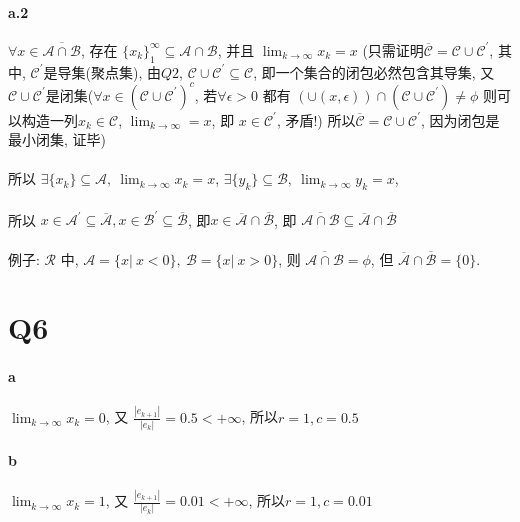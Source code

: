 \documentclass{article}
\begin{document}
\begin{CJK}{UTF8}{gbsn}
  \paragraph{a.2}
    $\forall x \in \overline{\mathcal{A} \cap \mathcal{B}}$, 存在 $\{x_k\}_1^{\infty} \subseteq \mathcal{A} \cap \mathcal{B}$, 并且 $\lim_{k \to \infty} x_k = x$ (只需证明$\overline{\mathcal{C}} = \mathcal{C} \cup \mathcal{C}^{'}$, 其中, $\mathcal{C}^{'}$是导集(聚点集), 由$Q2$, $\mathcal{C} \cup \mathcal{C}^{'} \subseteq \mathcal{C}$, 即一个集合的闭包必然包含其导集, 又$\mathcal{C} \cup \mathcal{C}^{'}$是闭集($\forall x \in (\mathcal{C} \cup \mathcal{C}^{'})^c$, 若$\forall \epsilon > 0$ 都有 $(\cup(x, \epsilon)) \cap (\mathcal{C} \cup \mathcal{C}^{'}) \not= \phi$ 则可以构造一列$x_k \in \mathcal{C}$, $\lim_{k \to \infty} = x$, 即 $x \in \mathcal{C}^{'}$, 矛盾!) 所以$\overline{\mathcal{C}} = \mathcal{C} \cup \mathcal{C}^{'}$, 因为闭包是最小闭集, 证毕)
    \paragraph{}
    所以 $\exists \{x_k\} \subseteq \mathcal{A},\ \lim_{k \to \infty} x_k = x$, $\exists \{y_k\} \subseteq \mathcal{B},\ \lim_{k \to \infty} y_k = x$,
    \paragraph{}
    所以 $x \in \mathcal{A}^{'} \subseteq \overline{\mathcal{A}}, x \in \mathcal{B}^{'} \subseteq \overline{\mathcal{B}}$, 即$x \in \overline{\mathcal{A}} \cap \overline{\mathcal{B}}$, 即 $\overline{\mathcal{A} \cap \mathcal{B}} \subseteq \overline{\mathcal{A}} \cap \overline{\mathcal{B}}$
    \paragraph{}
    例子: $\mathcal{R}$ 中, $\mathcal{A} = \{x |\ x < 0\},\ \mathcal{B} = \{x |\ x > 0\}$, 则 $\overline{\mathcal{A} \cap \mathcal{B}} = \phi$, 但 $\overline{\mathcal{A}} \cap \overline{\mathcal{B}} = \{0\}$.
\section{Q6}
  \paragraph{a}
    $\lim_{k \to \infty} x_k = 0$, 又 $\frac{|e_{k + 1}|}{|e_k|} = 0.5 < +\infty$, 所以$r = 1, c = 0.5$
  \paragraph{b}
    $\lim_{k \to \infty} x_k = 1$, 又 $\frac{|e_{k + 1}|}{|e_k|} = 0.01 < +\infty$, 所以$r = 1, c = 0.01$

\end{CJK}
\end{document}
